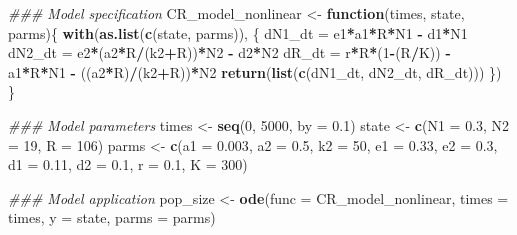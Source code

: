 \documentclass[
]{book}
\newenvironment{Shaded}{\begin{snugshade}}{\end{snugshade}}
\newcommand{\CommentTok}[1]{\textcolor[rgb]{0.56,0.35,0.01}{\textit{#1}}}
\newcommand{\ControlFlowTok}[1]{\textcolor[rgb]{0.13,0.29,0.53}{\textbf{#1}}}
\newcommand{\DataTypeTok}[1]{\textcolor[rgb]{0.13,0.29,0.53}{#1}}
\newcommand{\DecValTok}[1]{\textcolor[rgb]{0.00,0.00,0.81}{#1}}
\newcommand{\FloatTok}[1]{\textcolor[rgb]{0.00,0.00,0.81}{#1}}
\newcommand{\KeywordTok}[1]{\textcolor[rgb]{0.13,0.29,0.53}{\textbf{#1}}}
\newcommand{\NormalTok}[1]{#1}
\newcommand{\OperatorTok}[1]{\textcolor[rgb]{0.81,0.36,0.00}{\textbf{#1}}}
\newcommand{\StringTok}[1]{\textcolor[rgb]{0.31,0.60,0.02}{#1}}
\begin{document}
\begin{Shaded}
\begin{Highlighting}[]
\CommentTok{### Model specification}
\NormalTok{CR_model_nonlinear <-}\StringTok{ }\ControlFlowTok{function}\NormalTok{(times, state, parms)\{}
  \KeywordTok{with}\NormalTok{(}\KeywordTok{as.list}\NormalTok{(}\KeywordTok{c}\NormalTok{(state, parms)), \{}
\NormalTok{         dN1_dt =}\StringTok{ }\NormalTok{e1}\OperatorTok{*}\NormalTok{a1}\OperatorTok{*}\NormalTok{R}\OperatorTok{*}\NormalTok{N1 }\OperatorTok{-}\StringTok{ }\NormalTok{d1}\OperatorTok{*}\NormalTok{N1}
\NormalTok{         dN2_dt =}\StringTok{ }\NormalTok{e2}\OperatorTok{*}\NormalTok{(a2}\OperatorTok{*}\NormalTok{R}\OperatorTok{/}\NormalTok{(k2}\OperatorTok{+}\NormalTok{R))}\OperatorTok{*}\NormalTok{N2 }\OperatorTok{-}\StringTok{ }\NormalTok{d2}\OperatorTok{*}\NormalTok{N2}
\NormalTok{         dR_dt =}\StringTok{  }\NormalTok{r}\OperatorTok{*}\NormalTok{R}\OperatorTok{*}\NormalTok{(}\DecValTok{1}\OperatorTok{-}\NormalTok{(R}\OperatorTok{/}\NormalTok{K)) }\OperatorTok{-}\StringTok{ }\NormalTok{a1}\OperatorTok{*}\NormalTok{R}\OperatorTok{*}\NormalTok{N1 }\OperatorTok{-}\StringTok{ }\NormalTok{((a2}\OperatorTok{*}\NormalTok{R)}\OperatorTok{/}\NormalTok{(k2}\OperatorTok{+}\NormalTok{R))}\OperatorTok{*}\NormalTok{N2}
         \KeywordTok{return}\NormalTok{(}\KeywordTok{list}\NormalTok{(}\KeywordTok{c}\NormalTok{(dN1_dt, dN2_dt, dR_dt)))}
\NormalTok{       \})}
\NormalTok{\}}

\CommentTok{### Model parameters}
\NormalTok{times <-}\StringTok{ }\KeywordTok{seq}\NormalTok{(}\DecValTok{0}\NormalTok{, }\DecValTok{5000}\NormalTok{, }\DataTypeTok{by =} \FloatTok{0.1}\NormalTok{)  }
\NormalTok{state <-}\StringTok{ }\KeywordTok{c}\NormalTok{(}\DataTypeTok{N1 =} \FloatTok{0.3}\NormalTok{, }\DataTypeTok{N2 =} \DecValTok{19}\NormalTok{, }\DataTypeTok{R =} \DecValTok{106}\NormalTok{) }
\NormalTok{parms <-}\StringTok{ }\KeywordTok{c}\NormalTok{(}\DataTypeTok{a1 =} \FloatTok{0.003}\NormalTok{, }\DataTypeTok{a2 =} \FloatTok{0.5}\NormalTok{, }\DataTypeTok{k2 =} \DecValTok{50}\NormalTok{, }\DataTypeTok{e1 =} \FloatTok{0.33}\NormalTok{, }\DataTypeTok{e2 =} \FloatTok{0.3}\NormalTok{, }\DataTypeTok{d1 =} \FloatTok{0.11}\NormalTok{, }\DataTypeTok{d2 =} \FloatTok{0.1}\NormalTok{, }\DataTypeTok{r =} \FloatTok{0.1}\NormalTok{, }\DataTypeTok{K =} \DecValTok{300}\NormalTok{)}

\CommentTok{### Model application}
\NormalTok{pop_size <-}\StringTok{ }\KeywordTok{ode}\NormalTok{(}\DataTypeTok{func =}\NormalTok{ CR_model_nonlinear, }\DataTypeTok{times =}\NormalTok{ times, }\DataTypeTok{y =}\NormalTok{ state, }\DataTypeTok{parms =}\NormalTok{ parms)}


\end{Highlighting}
\end{Shaded}
\end{document}
